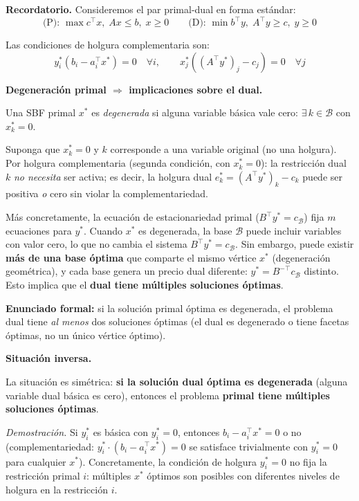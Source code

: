 \documentclass{article}
\begin{document}
\textbf{Recordatorio.} Consideremos el par primal-dual en forma estándar:
$$\text{(P): }\max c^\top x,\;Ax\leq b,\;x\geq0 \qquad \text{(D): }\min b^\top y,\;A^\top y\geq c,\;y\geq0$$

Las condiciones de holgura complementaria son:
$$y_i^*(b_i-a_i^\top x^*)=0\quad\forall i,\qquad x_j^*((A^\top y^*)_j-c_j)=0\quad\forall j$$

\textbf{Degeneración primal $\Rightarrow$ implicaciones sobre el dual.}

Una SBF primal $x^*$ es \emph{degenerada} si alguna variable básica vale cero: $\exists\,k\in\mathcal{B}$ con $x_k^*=0$.

Suponga que $x_k^*=0$ y $k$ corresponde a una variable original (no una holgura). Por holgura complementaria (segunda condición, con $x_k^*=0$): la restricción dual $k$ \emph{no necesita} ser activa; es decir, la holgura dual $e_k^*=(A^\top y^*)_k-c_k$ puede ser positiva \emph{o} cero sin violar la complementariedad.

Más concretamente, la ecuación de estacionariedad primal ($B^\top y^* = c_\mathcal{B}$) fija $m$ ecuaciones para $y^*$. Cuando $x^*$ es degenerada, la base $\mathcal{B}$ puede incluir variables con valor cero, lo que no cambia el sistema $B^\top y^*=c_\mathcal{B}$. Sin embargo, puede existir \textbf{más de una base óptima} que comparte el mismo vértice $x^*$ (degeneración geométrica), y cada base genera un precio dual diferente: $y^*=B^{-\top}c_\mathcal{B}$ distinto. Esto implica que el \textbf{dual tiene múltiples soluciones óptimas}.

\textbf{Enunciado formal:} si la solución primal óptima es degenerada, el problema dual tiene \emph{al menos} dos soluciones óptimas (el dual es degenerado o tiene facetas óptimas, no un único vértice óptimo).

\textbf{Situación inversa.}

La situación es simétrica: \textbf{si la solución dual óptima es degenerada} (alguna variable dual básica es cero), entonces el problema \textbf{primal tiene múltiples soluciones óptimas}.

\textit{Demostración.} Si $y_i^*$ es básica con $y_i^*=0$, entonces $b_i-a_i^\top x^*=0$ o no (complementariedad: $y_i^*\cdot(b_i-a_i^\top x^*)=0$ se satisface trivialmente con $y_i^*=0$ para cualquier $x^*$). Concretamente, la condición de holgura $y_i^*=0$ no fija la restricción primal $i$: múltiples $x^*$ óptimos son posibles con diferentes niveles de holgura en la restricción $i$.
\end{document}
